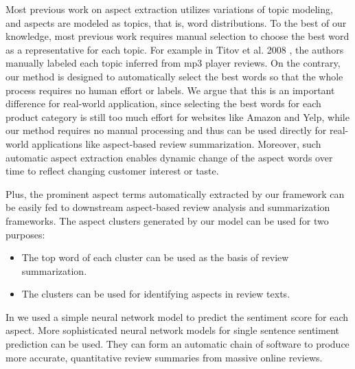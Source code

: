 
%
Most previous work on aspect extraction utilizes variations of 
topic modeling, and aspects are modeled as topics, that is, 
word distributions. 
To the best of our knowledge, most previous work requires 
manual selection to choose the best word as a representative for 
each topic. 
For example in Titov et al. 2008 \cite{titov2008modeling}, 
the authors manually labeled each topic inferred from mp3 player reviews. 
On the contrary, our method is designed to automatically select the 
best words so that the whole process requires no human effort or labels. 
We argue that this is an important difference for real-world application, 
since selecting the best words for each product category is still 
too much effort for websites like Amazon and Yelp, while 
our method requires no manual processing and thus can be 
used directly for real-world applications like aspect-based 
review summarization. Moreover, such automatic aspect extraction enables
dynamic change of the aspect words over time to reflect changing customer
interest or taste.

Plus, the prominent aspect terms automatically extracted by our framework can be easily fed to downstream aspect-based review analysis and summarization frameworks. 
The aspect clusters generated by our model can be used for two purposes:
\begin{itemize}
    \item The top word of each cluster can be used as the basis of
          review summarization.
    \item The clusters can be used for identifying aspects in review texts.
\end{itemize}
In  we used a simple neural network model to predict
the sentiment score for each aspect. More sophisticated  
neural network models for single sentence sentiment prediction
\cite{maas2011learning,socher2013recursive,dos2014deep,tang2015document}
can be used. 
They can form an automatic chain of software to
produce more accurate, quantitative review summaries from massive online reviews.
